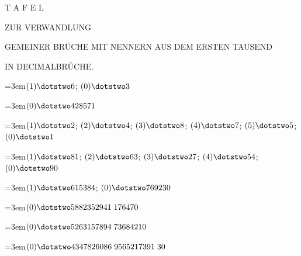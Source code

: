 \clearpage{}\thispagestyle{empty}
\renewcommand{\BookRunningTitle}{Verwandlung gemeiner Brüche in Decimalbrüche}
\begin{center}
\vspace*{1.0in}
{\LARGE T A F E L}\par\bigskip
{\large ZUR VERWANDLUNG}\par\bigskip
{\Large GEMEINER BRÜCHE MIT NENNERN AUS DEM ERSTEN TAUSEND}\par\bigskip
{\large IN DECIMALBRÜCHE.}
\end{center}

\clearpage{}%
\begingroup\raggedright
\par\noindent\hangindent=3em\enspace $(1)\dotstwo6$; $(0)\dotstwo3$\par\smallskip

\par\noindent\hangindent=3em\enspace $(0)\dotstwo428571$\par\smallskip

\par\noindent\hangindent=3em\enspace $(1)\dotstwo2$; $(2)\dotstwo4$; $(3)\dotstwo8$; $(4)\dotstwo7$; $(5)\dotstwo5$; $(0)\dotstwo1$\par\smallskip

\par\noindent\hangindent=3em\enspace $(1)\dotstwo81$; $(2)\dotstwo63$; $(3)\dotstwo27$; $(4)\dotstwo54$; $(0)\dotstwo90$\par\smallskip

\par\noindent\hangindent=3em\enspace $(1)\dotstwo615384$; $(0)\dotstwo769230$\par\smallskip

\par\noindent\hangindent=3em\enspace $(0)\dotstwo5882352941\;\allowbreak 176470$\par\smallskip

\par\noindent\hangindent=3em\enspace $(0)\dotstwo5263157894\;\allowbreak 73684210$\par\smallskip

\par\noindent\hangindent=3em\enspace $(0)\dotstwo4347826086\;\allowbreak 9565217391\;\allowbreak 30$\par\smallskip

